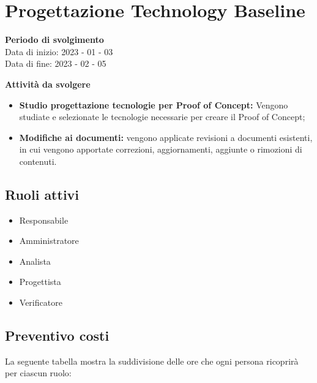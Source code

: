 \section{Progettazione Technology Baseline}

\textbf{Periodo di svolgimento}
\\ Data di inizio: 2023 - 01 - 03 \\ Data di fine: 2023 - 02 - 05

\textbf{Attività da svolgere}
    \begin{itemize}
        \item \textbf{Studio progettazione tecnologie per Proof of Concept:} Vengono studiate e selezionate le tecnologie necessarie per creare il Proof of Concept; 
        \item \textbf{Modifiche ai documenti:} vengono applicate revisioni a documenti esistenti, in cui vengono apportate correzioni, aggiornamenti, aggiunte o rimozioni di contenuti.
    \end{itemize}

\subsection{Ruoli attivi}
\begin{itemize}
    \item Responsabile
    \item Amministratore 
    \item Analista 
    \item Progettista 
    \item Verificatore 
\end{itemize}

\subsection{Preventivo costi}

La seguente tabella mostra la suddivisione delle ore che ogni persona ricoprirà per ciascun ruolo:

